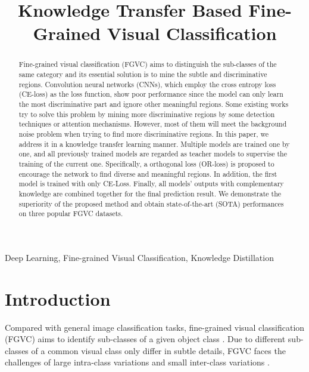 \documentclass{article}
\begin{document}
\sloppy

\def\x{{\mathbf x}}
\def\L{{\cal L}}


\title{Knowledge Transfer Based Fine-Grained Visual Classification}
\address{}


\maketitle


\begin{abstract}

Fine-grained visual classification (FGVC) aims to distinguish the sub-classes of the same category and its essential solution is to mine the subtle and discriminative regions. Convolution neural networks (CNNs), which employ the cross entropy loss (CE-loss) as the loss function, show poor performance since the model can only learn the most discriminative part and ignore other meaningful regions. Some existing works try to solve this problem by mining more discriminative regions by some detection techniques or attention mechanisms. However, most of them will meet the background noise problem when trying to find more discriminative regions. In this paper, we address it in a knowledge transfer learning manner. Multiple models are trained one by one, and all previously trained models are regarded as teacher models to supervise the training of the current one. Specifically, a orthogonal loss (OR-loss) is proposed to encourage the network to find diverse and meaningful regions. In addition, the first model is trained with only CE-Loss. Finally, all models' outputs with complementary knowledge are combined together for the final prediction result. We demonstrate the superiority of the proposed method and obtain state-of-the-art (SOTA) performances on three popular FGVC datasets.



\end{abstract}
\begin{keywords}
Deep Learning, Fine-grained Visual Classification, Knowledge Distillation
\end{keywords}
\section{Introduction}
\label{sec:intro}
Compared with general image classification tasks, fine-grained visual classification (FGVC) aims to identify sub-classes of a given object class \cite{fu2017look,zheng2017learning,yang2018learning,ge2019weakly,zhang2019learning}. Due to different sub-classes of a common visual class only differ in subtle details, FGVC faces the challenges of large intra-class variations and small inter-class variations \cite{fu2017look,zhang2019learning}. 
\end{document}
